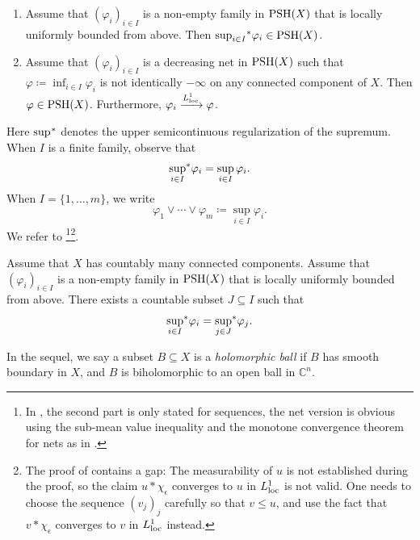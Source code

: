 \begin{proposition}\label{prop:pshfunction_closedseq}
\leavevmode
\begin{enumerate}
    \item\label{itm:prop:pshfunction_closedseq:1} Assume that $(\varphi_i)_{i\in I}$ is a non-empty family in $\PSH(X)$ that is locally uniformly bounded from above. Then $\uscsup[i\in I] \varphi_i\in \PSH(X)$.
    \item\label{itm:prop:pshfunction_closedseq:2} Assume that $(\varphi_i)_{i\in I}$ is a decreasing net in $\PSH(X)$ such that $\varphi\coloneqq \inf_{i\in I}\varphi_i$ is not identically $-\infty$ on any connected component of $X$. Then $\varphi\in \PSH(X)$. Furthermore, $\varphi_i\xrightarrow{L^1_{\loc}} \varphi$.
\end{enumerate}
\end{proposition}
Here $\uscsup$ denotes the upper semicontinuous regularization of the supremum. When $I$ is a finite family, observe that
\[
\uscsup[i\in I]\varphi_i=  \sup_{i\in I}\varphi_i.
\]
When $I=\{1,\ldots,m\}$, we write
\[
    \varphi_1\lor \cdots\lor \varphi_m\coloneqq   \sup_{i\in I}\varphi_i.
\]
We refer to \cite[Proposition~1.28, Proposition~1.40]{GZ17}\footnote{In \cite[Proposition~1.28]{GZ17}, the second part is only stated for sequences, the net version is obvious using the sub-mean value inequality and the monotone convergence theorem for nets as in \cite[Proposition~7.12]{Fol99}.}\footnote{The proof of \cite[Proposition~1.40]{GZ17} contains a gap: The measurability of $u$ is not established during the proof, so the claim $u \ast \chi_{\epsilon}$ converges to $u$ in $L^1_{\loc}$ is not valid. One needs to choose the sequence $(v_j)_j$ carefully so that $v\leq u$, and use the fact that $v \ast \chi_{\epsilon}$ converges to $v$ in $L^1_{\loc}$ instead.}.

\begin{proposition}\label{prop:Choquet}
    Assume that $X$ has countably many connected components.
    Assume that $(\varphi_i)_{i\in I}$ is a non-empty family in $\PSH(X)$ that is locally uniformly bounded from above. There exists a countable subset $J\subseteq I$ such that
    \[
    \uscsup[i\in I] \varphi_i=\uscsup[j\in J] \varphi_j.
    \]
\end{proposition}
In the sequel, we say a subset $B\subseteq X$ is a \emph{holomorphic ball} if $B$ has smooth boundary in $X$, and $B$ is biholomorphic to an open ball in $\mathbb{C}^n$.

